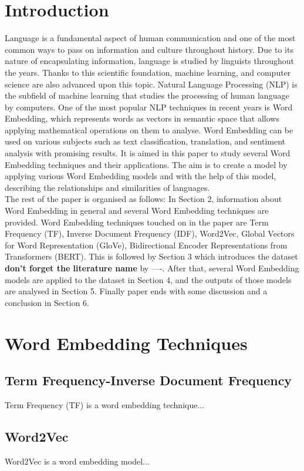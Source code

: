 \documentclass[man]{apa7}
\begin{document}
\section{Introduction}
Language is a fundamental aspect of human communication and one of the most common ways to pass on information and culture throughout history. Due to its nature of encapsulating information, language is studied by linguists throughout the years. Thanks to this scientific foundation, machine learning, and computer science are also advanced upon this topic. Natural Language Processing (NLP) is the subfield of machine learning that studies the processing of human language by computers. One of the most popular NLP techniques in recent years is Word Embedding, which represents words as vectors in semantic space that allows applying mathematical operations on them to analyse. Word Embedding can be used on various subjects such as text classification, translation, and sentiment analysis with promising results. It is aimed in this paper to study several Word Embedding techniques and their applications. The aim is to create a model by applying various Word Embedding models and with the help of this model, describing the relationships and similarities of languages.\\
The rest of the paper is organised as follows: In Section 2, information about Word Embedding in general and several Word Embedding techniques are provided. Word Embedding techniques touched on in the paper are Term Frequency (TF), Inverse Document Frequency (IDF), Word2Vec, Global Vectors for Word Representation (GloVe), Bidirectional Encoder Representations from Transformers (BERT). This is followed by Section 3 which introduces the dataset {\large \textbf{don't forget the literature name}} by ----. After that, several Word Embedding models are applied to the dataset in Section 4, and the outputs of those models are analysed in Section 5. Finally paper ends with some discussion and a conclusion in Section 6.

\section{Word Embedding Techniques}
\lipsum[0-1]
\subsection{Term Frequency-Inverse Document Frequency}
Term Frequency (TF) is a word embedding technique...
\subsection{Word2Vec}
Word2Vec is a word embedding model...
\end{document}
